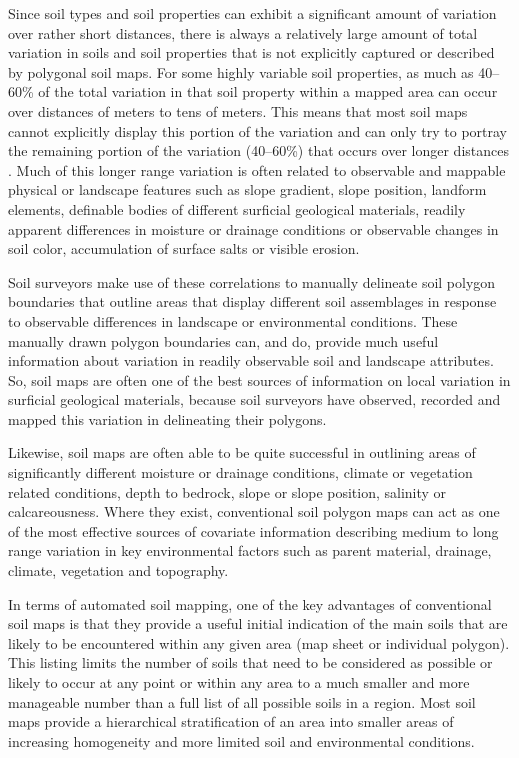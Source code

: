 \documentclass[11pt]{krantz}
\theoremstyle{definition}
\theoremstyle{definition}
\theoremstyle{definition}
\theoremstyle{remark}
\begin{document}
Since soil types and soil properties can exhibit a significant amount of
variation over rather short distances, there is always a relatively
large amount of total variation in soils and soil properties that is not
explicitly captured or described by polygonal soil maps. For some highly
variable soil properties, as much as 40--60\% of the total variation in
that soil property within a mapped area can occur over distances of
meters to tens of meters. This means that most soil maps cannot
explicitly display this portion of the variation and can only try to
portray the remaining portion of the variation (40--60\%) that occurs
over longer distances \citep{Heuvelink2001Geoderma}. Much of this longer
range variation is often related to observable and mappable physical or
landscape features such as slope gradient, slope position, landform
elements, definable bodies of different surficial geological materials,
readily apparent differences in moisture or drainage conditions or
observable changes in soil color, accumulation of surface salts or
visible erosion.

Soil surveyors make use of these correlations to manually delineate soil
polygon boundaries that outline areas that display different soil
assemblages in response to observable differences in landscape or
environmental conditions. These manually drawn polygon boundaries can,
and do, provide much useful information about variation in readily
observable soil and landscape attributes. So, soil maps are often one of
the best sources of information on local variation in surficial
geological materials, because soil surveyors have observed, recorded and
mapped this variation in delineating their polygons.

Likewise, soil maps are often able to be quite successful in outlining
areas of significantly different moisture or drainage conditions,
climate or vegetation related conditions, depth to bedrock, slope or
slope position, salinity or calcareousness. Where they exist,
conventional soil polygon maps can act as one of the most effective
sources of covariate information describing medium to long range
variation in key environmental factors such as parent material,
drainage, climate, vegetation and topography.

In terms of automated soil mapping, one of the key advantages of
conventional soil maps is that they provide a useful initial indication
of the main soils that are likely to be encountered within any given
area (map sheet or individual polygon). This listing limits the number
of soils that need to be considered as possible or likely to occur at
any point or within any area to a much smaller and more manageable
number than a full list of all possible soils in a region. Most soil
maps provide a hierarchical stratification of an area into smaller areas
of increasing homogeneity and more limited soil and environmental
conditions.
\end{document}
